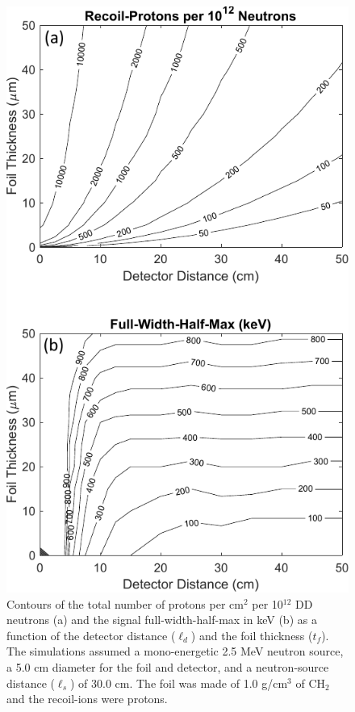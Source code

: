 \begin{figure}[h!]
	
	\centering
	\includegraphics[scale=1.2]{Figures/distanceThicknessContours.pdf}
	\caption{Contours of the total number of protons per cm$^2$ per 10$^{12}$ DD neutrons (a) and the signal full-width-half-max in keV (b) as a function of the detector distance ($\ell_d$) and the foil thickness ($t_f$). The simulations assumed a mono-energetic 2.5 MeV neutron source, a 5.0 cm diameter for the foil and detector, and a neutron-source distance ($\ell_s$) of 30.0 cm. The foil was made of 1.0 g/cm$^3$ of CH$_2$ and the recoil-ions were protons.}
	\label{fig_distanceThicknessContour}
	
\end{figure}

